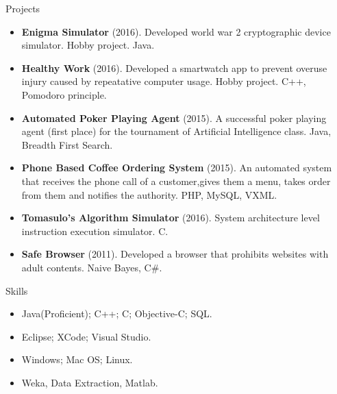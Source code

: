 \documentclass[]{mcdowellcv}
\begin{document}
	
	\begin{cvsection}{Projects}
		\begin{cvsubsection}{}{}{}
			\begin{itemize}
			\item \textbf{Enigma Simulator} (2016).  Developed world war 2 cryptographic device simulator. Hobby project.  Java.
				\item \textbf{Healthy Work} (2016). Developed a smartwatch app to prevent overuse injury caused by repeatative computer usage. Hobby project. C++, Pomodoro principle.				
				\item \textbf{Automated Poker Playing Agent} (2015). A successful poker playing agent (first place) for the tournament of Artificial Intelligence class. Java, Breadth First Search.
				\item \textbf{Phone Based Coffee Ordering System} (2015). An automated system that receives the phone call of a customer,gives them a menu, takes order from them and notifies the authority.  PHP, MySQL, VXML.
			\item \textbf{Tomasulo’s Algorithm Simulator} (2016). System architecture level instruction execution simulator. C.	
\item \textbf{Safe Browser} (2011). Developed a browser that prohibits websites with adult contents. Naive Bayes, C\#.
			\end{itemize}
		\end{cvsubsection}
	\end{cvsection}
	
	
	\begin{cvsection}{Skills}
		\begin{cvsubsection}{}{}{}	
			\begin{itemize}
				\item Java(Proficient); C++; C; Objective-C; SQL.  
				\item Eclipse; XCode; Visual Studio.
				\item Windows; Mac OS; Linux. 
				\item Weka, Data Extraction, Matlab.
			\end{itemize}
		\end{cvsubsection}
	\end{cvsection}
	
\end{document}
